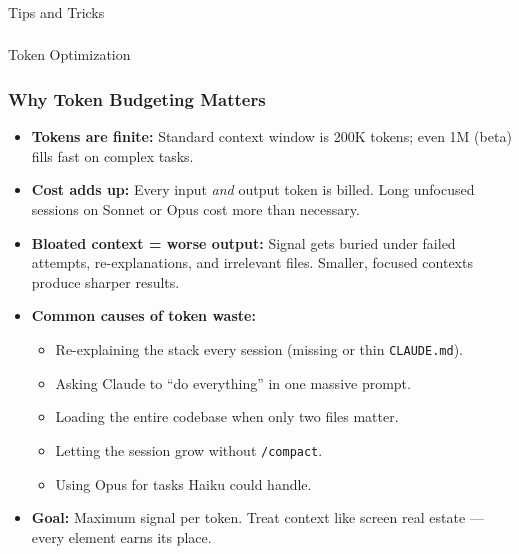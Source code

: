 \begin{frame}[fragile]\frametitle{}

\begin{center}
{\Large Tips and Tricks}
\end{center}
\end{frame}

\begin{frame}[fragile]\frametitle{}
\begin{center}
{\Large Token Optimization}
\end{center}
\end{frame}

\begin{frame}[fragile]\frametitle{Why Token Budgeting Matters}
  \begin{itemize}
    \item \textbf{Tokens are finite:} Standard context window is 200K tokens; even 1M (beta) fills fast on complex tasks.
    \item \textbf{Cost adds up:} Every input \textit{and} output token is billed. Long unfocused sessions on Sonnet or Opus cost more than necessary.
    \item \textbf{Bloated context = worse output:} Signal gets buried under failed attempts, re-explanations, and irrelevant files. Smaller, focused contexts produce sharper results.
    \item \textbf{Common causes of token waste:}
      \begin{itemize}
        \item Re-explaining the stack every session (missing or thin \texttt{CLAUDE.md}).
        \item Asking Claude to ``do everything'' in one massive prompt.
        \item Loading the entire codebase when only two files matter.
        \item Letting the session grow without \texttt{/compact}.
        \item Using Opus for tasks Haiku could handle.
      \end{itemize}
    \item \textbf{Goal:} Maximum signal per token. Treat context like screen real estate --- every element earns its place.
  \end{itemize}
\end{frame}


